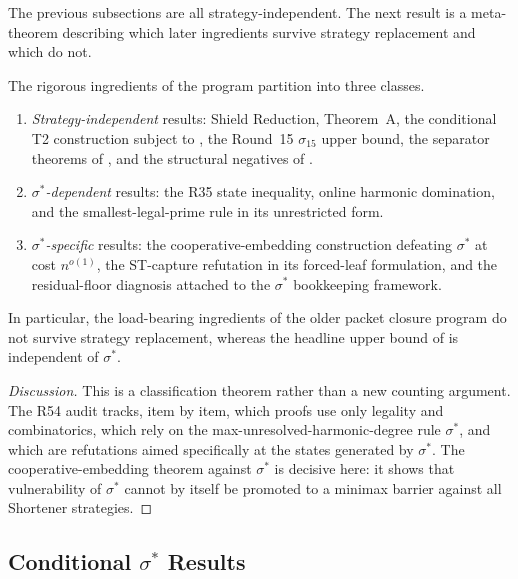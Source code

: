 The previous subsections are all strategy-independent.  The next result is a
meta-theorem describing which later ingredients survive strategy replacement
and which do not.

\begin{proposition}\label{prop:strategy-dependence}
The rigorous ingredients of the program partition into three classes.
\begin{enumerate}
  \item \emph{Strategy-independent} results: Shield Reduction, Theorem~A, the
  conditional T2 construction subject to , the
  Round~15 $\sigma_{15}$ upper bound, the separator theorems of
  , and the
  structural negatives of .
  \item \emph{$\sigma^*$-dependent} results: the R35 state inequality, online
  harmonic domination, and the smallest-legal-prime rule in its unrestricted
  form.
  \item \emph{$\sigma^*$-specific} results: the cooperative-embedding
  construction defeating $\sigma^*$ at cost $n^{o(1)}$, the ST-capture
  refutation in its forced-leaf formulation, and the residual-floor diagnosis
  attached to the $\sigma^*$ bookkeeping framework.
\end{enumerate}
In particular, the load-bearing ingredients of the older packet closure program
do not survive strategy replacement, whereas the headline upper bound of
 is independent of $\sigma^*$.
\end{proposition}

\begin{proof}[Discussion]
This is a classification theorem rather than a new counting argument.  The R54
audit tracks, item by item, which proofs use only legality and combinatorics,
which rely on the max-unresolved-harmonic-degree rule $\sigma^*$, and which are
refutations aimed specifically at the states generated by $\sigma^*$.  The
cooperative-embedding theorem against $\sigma^*$ is decisive here: it shows
that vulnerability of $\sigma^*$ cannot by itself be promoted to a minimax
barrier against all Shortener strategies.
\end{proof}

\subsection{Conditional $\sigma^*$ Results}

